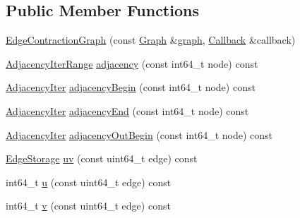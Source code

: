 \subsection*{Public Member Functions}
\begin{DoxyCompactItemize}
\item 
\hyperlink{classnifty_1_1graph_1_1EdgeContractionGraph_aa11f5c4752ab7b0d1f57a8efd374a5b6}{Edge\+Contraction\+Graph} (const \hyperlink{classnifty_1_1graph_1_1EdgeContractionGraph_a22f00237e657f393dfcaacdc10de9bba}{Graph} \&\hyperlink{classnifty_1_1graph_1_1EdgeContractionGraph_ae22624b7cd920b353a4a6a42bb3603c5}{graph}, \hyperlink{classnifty_1_1graph_1_1EdgeContractionGraph_a75e91e51c78d2f427a31c30dcd8996ed}{Callback} \&callback)
\item 
\hyperlink{structnifty_1_1graph_1_1EdgeContractionGraph_1_1AdjacencyIterRange}{Adjacency\+Iter\+Range} \hyperlink{classnifty_1_1graph_1_1EdgeContractionGraph_ac93df8e87fd2e86fa017a563544dabc8}{adjacency} (const int64\+\_\+t node) const 
\item 
\hyperlink{classnifty_1_1graph_1_1EdgeContractionGraph_a447212f5ced0c4ef4d304e8b89f4f200}{Adjacency\+Iter} \hyperlink{classnifty_1_1graph_1_1EdgeContractionGraph_a8e01ef0e79ab0947633f0907fc2bb2d0}{adjacency\+Begin} (const int64\+\_\+t node) const 
\item 
\hyperlink{classnifty_1_1graph_1_1EdgeContractionGraph_a447212f5ced0c4ef4d304e8b89f4f200}{Adjacency\+Iter} \hyperlink{classnifty_1_1graph_1_1EdgeContractionGraph_a1df973fa6162c58d6ed4b071038cc0b1}{adjacency\+End} (const int64\+\_\+t node) const 
\item 
\hyperlink{classnifty_1_1graph_1_1EdgeContractionGraph_a447212f5ced0c4ef4d304e8b89f4f200}{Adjacency\+Iter} \hyperlink{classnifty_1_1graph_1_1EdgeContractionGraph_a932630e316b688529a2a58917f165a93}{adjacency\+Out\+Begin} (const int64\+\_\+t node) const 
\item 
\hyperlink{classnifty_1_1graph_1_1EdgeContractionGraph_ad57e807f7df20892c7bbbb9b53d3aa08}{Edge\+Storage} \hyperlink{classnifty_1_1graph_1_1EdgeContractionGraph_abcba22be7d0d62b18390edcd501054ab}{uv} (const uint64\+\_\+t edge) const 
\item 
int64\+\_\+t \hyperlink{classnifty_1_1graph_1_1EdgeContractionGraph_a4d0519610b822ff3842b8baa3b5a2580}{u} (const uint64\+\_\+t edge) const 
\item 
int64\+\_\+t \hyperlink{classnifty_1_1graph_1_1EdgeContractionGraph_a0b321bb637fd8291985e8cecf3f87fc9}{v} (const uint64\+\_\+t edge) const 
\item 

\end{DoxyCompactItemize}
